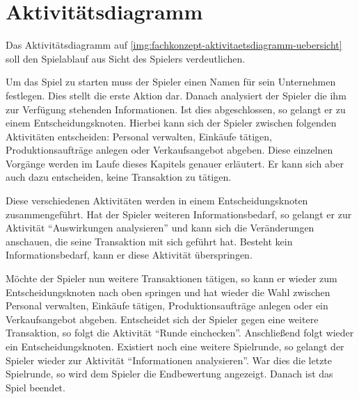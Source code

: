 \section{Aktivitätsdiagramm}
\label{sec:fachkonzept-aktivitaetsdiagramm}


Das Aktivitätsdiagramm auf \vref{img:fachkonzept-aktivitaetsdiagramm-uebersicht} soll den Spielablauf aus Sicht des Spielers verdeutlichen.  

Um das Spiel zu starten muss der Spieler einen Namen für sein Unternehmen festlegen. Dies stellt die erste Aktion dar. Danach analysiert der Spieler die ihm zur Verfügung stehenden Informationen. Ist dies abgeschlossen, so gelangt er zu einem Entscheidungsknoten. Hierbei kann sich der Spieler zwischen folgenden Aktivitäten entscheiden: Personal verwalten, Einkäufe tätigen, Produktionsaufträge anlegen oder Verkaufsangebot abgeben. Diese einzelnen Vorgänge werden im Laufe dieses Kapitels genauer erläutert. Er kann sich aber auch dazu entscheiden, keine Transaktion zu tätigen. 

Diese verschiedenen Aktivitäten werden in einem Entscheidungsknoten zusammengeführt. Hat der Spieler weiteren Informationsbedarf, so gelangt er zur Aktivität “Auswirkungen analysieren” und kann sich die Veränderungen anschauen, die seine Transaktion mit sich geführt hat. Besteht kein Informationsbedarf, kann er diese Aktivität überspringen. 

Möchte der Spieler nun weitere Transaktionen tätigen, so kann er wieder zum Entscheidungsknoten nach oben springen und hat wieder die Wahl zwischen Personal verwalten, Einkäufe tätigen, Produktionsaufträge anlegen oder ein Verkaufsangebot abgeben. Entscheidet sich der Spieler gegen eine weitere Transaktion, so folgt die Aktivität “Runde einchecken”. Anschließend folgt wieder ein Entscheidungsknoten. Existiert noch eine weitere Spielrunde, so gelangt der Spieler wieder zur Aktivität “Informationen analysieren”. War dies die letzte Spielrunde, so wird dem Spieler die Endbewertung angezeigt. Danach ist das Spiel beendet.

